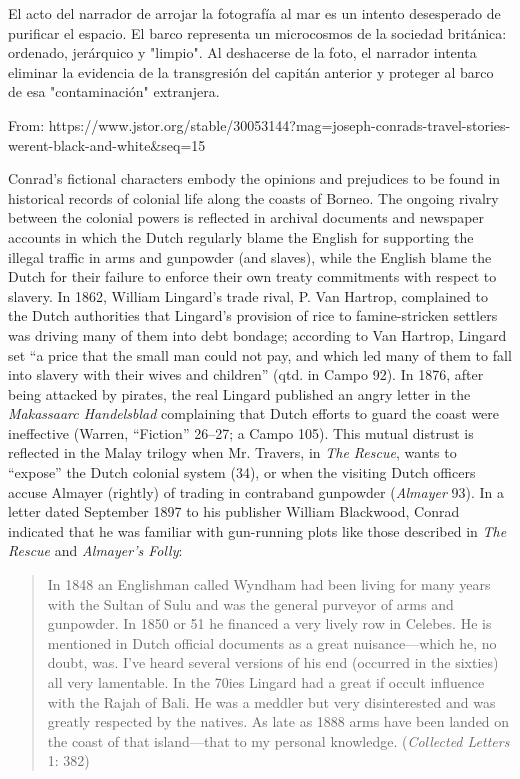 \documentclass[a4paper, 12pt]{article}
\begin{document}
El acto del narrador de arrojar la fotografía al mar es un intento desesperado
de purificar el espacio. El barco representa un microcosmos de la sociedad
británica: ordenado, jerárquico y "limpio". Al deshacerse de la foto, el
narrador intenta eliminar la evidencia de la transgresión del capitán anterior y
proteger al barco de esa "contaminación" extranjera.



\pagebreak 
From: https://www.jstor.org/stable/30053144?mag=joseph-conrads-travel-stories-werent-black-and-white&seq=15

Conrad's fictional characters embody the opinions and prejudices to be found in
historical records of colonial life along the coasts of Borneo. The ongoing
rivalry between the colonial powers is reflected in archival documents and
newspaper accounts in which the Dutch regularly blame the English for supporting the illegal
traffic in arms and gunpowder (and slaves), while the English blame the Dutch
for their failure to enforce their own treaty commitments with respect to
slavery. In 1862, William Lingard's trade rival, P. Van Hartrop, complained to
the Dutch authorities that Lingard's provision of rice to famine-stricken
settlers was driving many of them into debt bondage; according to Van Hartrop,
Lingard set ``a price that the small man could not pay, and which led many of
them to fall into slavery with their wives and children'' (qtd. in Campo 92).
In 1876, after being attacked by pirates, the real Lingard published an angry
letter in the \textit{Makassaarc Handelsblad} complaining that Dutch efforts to
guard the coast were ineffective (Warren, ``Fiction'' 26--27; a Campo 105).
This mutual distrust is reflected in the Malay trilogy when Mr. Travers, in
\textit{The Rescue}, wants to ``expose'' the Dutch colonial system (34), or
when the visiting Dutch officers accuse Almayer (rightly) of trading in
contraband gunpowder (\textit{Almayer} 93). In a letter dated September 1897 to
his publisher William Blackwood, Conrad indicated that he was familiar with
gun-running plots like those described in \textit{The Rescue} and
\textit{Almayer's Folly}:

\begin{quote}
In 1848 an Englishman called Wyndham had been living for many years with the
Sultan of Sulu and was the general purveyor of arms and gunpowder. In 1850 or 51
he financed a very lively row in Celebes. He is mentioned in Dutch official
documents as a great nuisance---which he, no doubt, was. I've heard several
versions of his end (occurred in the sixties) all very lamentable. In the 70ies
Lingard had a great if occult influence with the Rajah of Bali. He was a meddler
but very disinterested and was greatly respected by the natives. As late as 1888
arms have been landed on the coast of that island---that to my personal
knowledge. (\textit{Collected Letters} 1: 382)
\end{quote}
\end{document}
